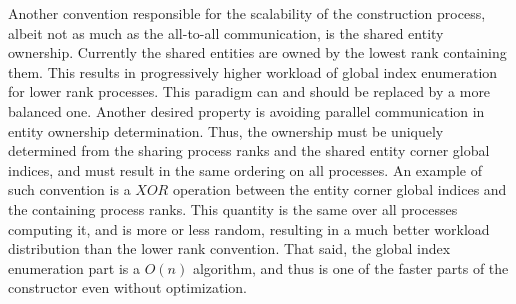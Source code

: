 \noindent
Another convention responsible for the scalability of the construction process, albeit not as much as the all-to-all communication, is the shared entity ownership. Currently the shared entities are owned by the lowest rank containing them. This results in progressively higher workload of global index enumeration for lower rank processes. This paradigm can and should be replaced by a more balanced one. Another desired property is avoiding parallel communication in entity ownership determination. Thus, the ownership must be uniquely determined from the sharing process ranks and the shared entity corner global indices, and must result in the same ordering on all processes. An example of such convention is a $XOR$ operation between the entity corner global indices and the containing process ranks. This quantity is the same over all processes computing it, and is more or less random, resulting in a much better workload distribution than the lower rank convention. That said, the global index enumeration part is a $O(n)$ algorithm, and thus is one of the faster parts of the constructor even without optimization.

